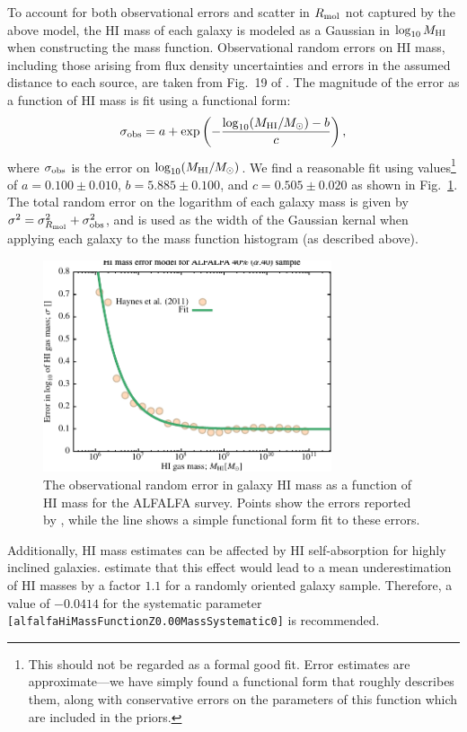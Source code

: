 To account for both observational errors and scatter in $R_{\rm mol}$ not captured by the above model, the HI mass of each galaxy is modeled as a Gaussian in $\log_{10}M_{\rm HI}$ when constructing the mass function. Observational random errors on HI mass, including those arising from flux density uncertainties and errors in the assumed distance to each source, are taken from Fig.~19 of \cite{haynes_arecibo_2011}. The magnitude of the error as a function of HI mass is fit using a functional form:
\begin{equation}
 \sigma_{\rm obs} = a + \exp\left(-{\log_{10}(M_{\rm HI}/M_\odot)-b\over c}\right),
\end{equation}
where $\sigma_{\rm obs}$ is the error on $\log_{10}(M_{\rm HI}/M_\odot)$. We find a reasonable fit using values\footnote{This should not be regarded as a formal good fit. Error estimates are approximate---we have simply found a functional form that roughly describes them, along with conservative errors on the parameters of this function which are included in the priors.} of $a=0.100 \pm 0.010$, $b=5.885 \pm 0.100$, and $c=0.505 \pm 0.020$ as shown in Fig.~\ref{fig:ALFALFAErrorModel}. The total random error on the logarithm of each galaxy mass is given by $\sigma^2 = \sigma_{R_{\rm mol}}^2+\sigma_{\rm obs}^2$, and is used as the width of the Gaussian kernal when applying each galaxy to the mass function histogram (as described above).

\begin{figure}
 \begin{center}
 \includegraphics[width=85mm,trim=0mm 0mm 0mm 4mm,clip]{Plots/DataAnalysis/alfalfaHIMassErrorModel.pdf}
 \caption{The observational random error in galaxy HI mass as a function of HI mass for the ALFALFA survey. Points show the errors reported by \protect\cite{haynes_arecibo_2011}, while the line shows a simple functional form fit to these errors.}
 \end{center}
 \label{fig:ALFALFAErrorModel}
\end{figure}

Additionally, HI mass estimates can be affected by HI self-absorption for highly inclined galaxies. \cite[][see also \protect\citealt{zwaan_hipass_2005}]{zwaan_h_1997} estimate that this effect would lead to a mean underestimation of HI masses by a factor $1.1$ for a randomly oriented galaxy sample. Therefore, a value of $-0.0414$ for the systematic parameter {\tt [alfalfaHiMassFunctionZ0.00MassSystematic0]} is recommended.
